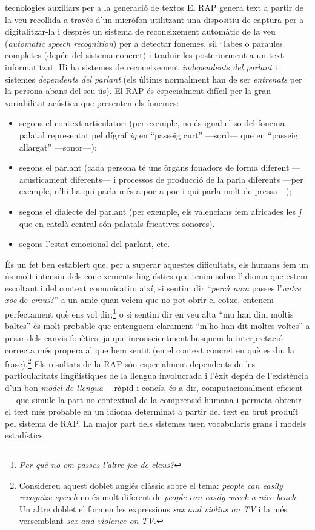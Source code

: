 \begin{persabermes}{tecnologies auxiliars per a la generació de textos}
  El RAP genera text a partir de la veu recollida a través d'un
  micròfon utilitzant una dispositiu de captura per a digitalitzar-la
  i després un sistema de reconeixement automàtic de la veu
  (\emph{automatic speech recognition}) per a detectar fonemes,
  síl·labes o paraules completes (depén del sistema concret) i
  traduir-les posteriorment a un text informatitzat.  Hi ha sistemes
  de reconeixement {\em independents del parlant} i sistemes
  \emph{dependents del parlant} (els últims normalment han de ser
  \emph{entrenats} per la persona abans del seu ús).  El RAP és
  especialment difícil per la gran variabilitat acústica que presenten
  els fonemes:
  \begin{itemize}
  \item segons el context articulatori (per exemple, no és igual el so
    del fonema palatal representat pel dígraf \emph{ig} en ``passeig
    curt'' ---sord--- que en ``passeig allargat'' ---sonor---);
  \item segons el parlant (cada persona té uns òrgans fonadors de
    forma diferent ---acústicament diferents--- i processos de
    producció de la parla diferents ---per exemple, n'hi ha qui parla
    més a poc a poc i qui parla molt de pressa---);
  \item segons el dialecte del parlant (per exemple, els valencians
    fem africades les \emph{j} que en català central són palatals
    fricatives sonores).
  \item segons l'estat emocional del parlant, etc.
  \end{itemize}
  És un fet ben establert que, per a superar aquestes dificultats, els
  humans fem un ús molt intensiu dels coneixements lingüístics que
  tenim sobre l'idioma que estem escoltant i del context comunicatiu:
  així, si sentim dir ``\emph{percà nom} passes l'\emph{antre xoc} de
  \emph{craus}?'' a un amic quan veiem que no pot obrir el cotxe,
  entenem perfectament què ens vol dir;\footnote{\emph{Per què no em
      passes l'altre joc de claus?}} o si sentim dir en veu alta ``mu
  han dim moltis baltes'' és molt probable que entenguem clarament
  ``m'ho han dit moltes voltes'' a pesar dels canvis fonètics, ja que
  inconscientment busquem la interpretació correcta més propera al que
  hem sentit (en el context concret en què es diu la
  frase).\footnote{Considereu aquest doblet anglés clàssic sobre el
    tema: \emph{people can easily recognize speech} no és molt
    diferent de {\em people can easily wreck a nice beach}. Un altre
    doblet el formen les expressions \emph{sax and violins on TV} i la
    més versemblant \emph{sex and violence on TV}.} Els resultats de
  la RAP són especialment dependents de les particularitats
  lingüístiques de la llengua involucrada i l'èxit depén de
  l'existència d'un bon \emph{model de llengua} ---ràpid i concís, és
  a dir, computacionalment eficient--- que simule la part no
  contextual de la comprensió humana i permeta obtenir el text més
  probable en un idioma determinat a partir del text en brut produït
  pel sistema de RAP. La major part dels sistemes usen vocabularis
  grans i models estadístics.


\end{persabermes}
